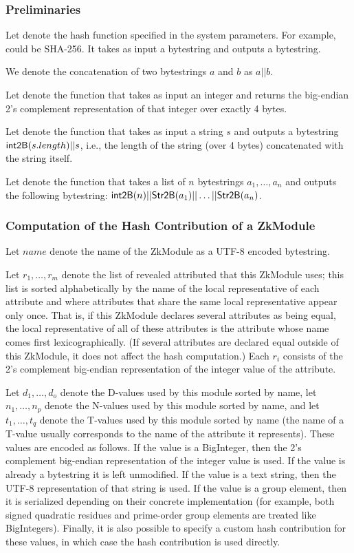  \subsubsection{Preliminaries}\label{ssec:challenge:prelim}
  Let \hashfunction denote the hash function specified in the system parameters. For example,
  \hashfunction could be SHA-256. It takes as input a bytestring and outputs a bytestring.

  We denote the concatenation of two bytestrings $a$ and $b$ as $a||b$.

  Let \intToBytes denote the function that takes as input an integer and returns
  the big-endian 2's complement representation of that integer over exactly 4 bytes.

  Let \stringToBytes denote the function that takes as input a string $s$ and outputs a bytestring
  $\textsf{int2B}(s.length)||s$, i.e., the length of the string (over 4 bytes) concatenated
  with the string itself.

  Let \serializelist denote the function that takes a list of $n$ bytestrings
  $a_1, \ldots, a_n$ and outputs the following bytestring:
  $\textsf{int2B}(n)||\textsf{Str2B}(a_1)||\ldots||\textsf{Str2B}(a_n)$.

  \subsubsection{Computation of the Hash Contribution of a ZkModule}
  Let $\textit{name}$ denote the name of the ZkModule as a UTF-8 encoded bytestring.

  Let $r_1, \ldots, r_m$ denote the list of revealed attributed that this ZkModule
  uses; this list is sorted alphabetically by the name of the local representative of each
  attribute and where attributes that share the same local representative appear only once.
  That is, if this ZkModule declares several attributes as being equal, the
  local representative of all of these attributes is the attribute whose name comes
  first lexicographically. (If several attributes are declared equal outside of this ZkModule,
  it does not affect the hash computation.)
  Each $r_i$ consists of the 2's complement big-endian representation of the integer value of
  the attribute.

  Let $d_1, \ldots, d_o$ denote the D-values used by this module sorted by name,
  let $n_1, \ldots, n_p$ denote the N-values used by this module sorted by name,
  and let $t_1, \ldots, t_q$ denote the T-values used by this module sorted by name (the name of a T-value usually corresponds to the name of the attribute it represents).
  These values are encoded as follows. If the value is a BigInteger, then the 2's complement big-endian representation of the
  integer value is used. If the value is already a bytestring it is left unmodified. If the value is a text string, then the UTF-8 representation
  of that string is used.
  If the value is a group element, then it is serialized depending on their concrete implementation (for example, both signed quadratic residues and prime-order group elements
  are treated like BigIntegers). Finally, it is also possible to specify a custom hash contribution for these values, in which case the hash contribution is used directly.

